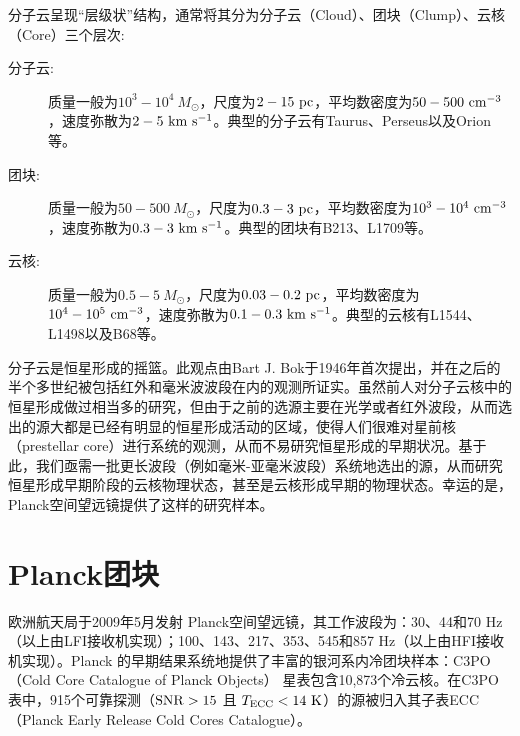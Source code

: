 \documentclass[UTF8, nocolorlinks]{pkuthss}
\begin{document}
		分子云呈现“层级状”结构\supercite{1994ApJ...423..681V}，通常将其分为分子云（Cloud）、团块（Clump）、云核（Core）三个层次\supercite{2007ARA&A..45..339B,2000prpl.conf...97W}:
		\begin{adjustwidth}{0.5cm}{0cm}
		\begin{description}
			\item[分子云:] 质量一般为$10^3-10^4\ M_{\odot}$，尺度为$2-15\rm\ pc$，平均数密度为$50-500\rm\ cm^{-3}$，速度弥散为$2- 5\rm\ km\ s^{-1}$\supercite{2007ARA&A..45..339B}。典型的分子云有Taurus、Perseus以及Orion等。

			\item[团块:] 质量一般为$50-500\ M_{\odot}$，尺度为$0.3-3\rm\ pc$，平均数密度为$10^3-10^4\rm\ cm^{-3}$，速度弥散为$0.3- 3\rm\ km\ s^{-1}$\supercite{2007ARA&A..45..339B}。典型的团块有B213、L1709等\supercite{2007ARA&A..45..339B}。

			\item[云核:] 质量一般为$0.5-5\ M_{\odot}$，尺度为$0.03-0.2\rm\ pc$，平均数密度为$10^4-10^5\rm\ cm^{-3}$，速度弥散为$0.1- 0.3\rm\ km\ s^{-1}$\supercite{2007ARA&A..45..339B}。典型的云核有L1544、L1498以及B68等\supercite{2007ARA&A..45..339B}。
		\end{description}
		\end{adjustwidth}

		分子云是恒星形成的摇篮。此观点由Bart J. Bok于1946年首次提出\supercite{1948HarMo...7...53B}，并在之后的半个多世纪被包括红外和毫米波波段在内的观测所证实\supercite{shu1987star,2007ARA&A..45..339B}。虽然前人对分子云核中的恒星形成做过相当多的研究，但由于之前的选源主要在光学或者红外波段，从而选出的源大都是已经有明显的恒星形成活动的区域，使得人们很难对星前核（prestellar core）进行系统的观测，从而不易研究恒星形成的早期状况。基于此，我们亟需一批更长波段（例如毫米-亚毫米波段）系统地选出的源，从而研究恒星形成早期阶段的云核物理状态，甚至是云核形成早期的物理状态。幸运的是，Planck空间望远镜提供了这样的研究样本。

	\section{Planck团块}

		欧洲航天局于2009年5月发射 Planck空间望远镜，其工作波段为：30、44和70 Hz（以上由LFI接收机实现）；100、143、217、353、545和857 Hz（以上由HFI接收机实现）\supercite{2011A&A...536A...1P}。Planck 的早期结果系统地提供了丰富的银河系内冷团块样本：C3PO（Cold Core Catalogue of Planck Objects） 星表包含10,873个冷云核\supercite{2011yCat.8088....0P,2011A&A...536A..23P}。在C3PO表中，915个可靠探测（$\rm SNR>15$ 且 $T_{\rm ECC}<14\rm\ K$）的源被归入其子表ECC（Planck Early Release Cold Cores Catalogue）\supercite{2011yCat.8088....0P,2011A&A...536A..23P}。
\end{document}
